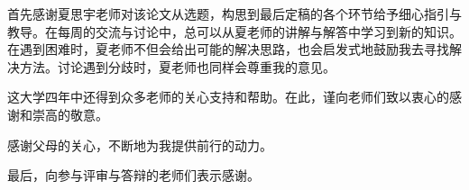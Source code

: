 \begin{acknowledgement}
首先感谢夏思宇老师对该论文从选题，构思到最后定稿的各个环节给予细心指引与教导。在每周的交流与讨论中，总可以从夏老师的讲解与解答中学习到新的知识。在遇到困难时，夏老师不但会给出可能的解决思路，也会启发式地鼓励我去寻找解决方法。讨论遇到分歧时，夏老师也同样会尊重我的意见。

这大学四年中还得到众多老师的关心支持和帮助。在此，谨向老师们致以衷心的感谢和崇高的敬意。

感谢父母的关心，不断地为我提供前行的动力。

最后，向参与评审与答辩的老师们表示感谢。
\end{acknowledgement}
